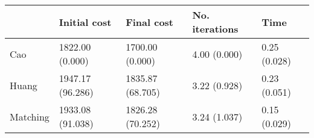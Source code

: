 \begin{tabular}{lllll}
\toprule
{} &      Initial cost &        Final cost & No. iterations &          Time \\
\midrule
Cao      &   1822.00 (0.000) &   1700.00 (0.000) &   4.00 (0.000) &  0.25 (0.028) \\
Huang    &  1947.17 (96.286) &  1835.87 (68.705) &   3.22 (0.928) &  0.23 (0.051) \\
Matching &  1933.08 (91.038) &  1826.28 (70.252) &   3.24 (1.037) &  0.15 (0.029) \\
\bottomrule
\end{tabular}
